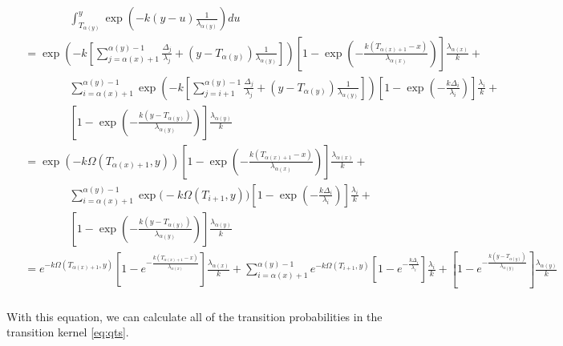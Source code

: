 \documentclass{article}
\begin{document}
\begin{align}
\begin{split}
    &\qquad \qquad \int_{T_{\alpha(y)}}^y \exp\left(-k(y-u)\frac{1}{\lambda_{\alpha(y)}}\right)du \\
    &= \exp\left(-k\left[\sum_{j=\alpha(x)+1}^{\alpha(y)-1}\frac{\Delta_j}{\lambda_j} +
        (y-T_{\alpha(y)})\frac{1}{\lambda_{\alpha(y)}}\right]\right) 
        \left[1-\exp\left(-\frac{k \left(T_{\alpha(x)+1}-x\right)}{\lambda_{\alpha(x)}}\right)\right]\frac{\lambda_{\alpha(x)}}{k}+\\
    &\qquad\qquad \sum_{i=\alpha(x)+1}^{\alpha(y)-1}
        \exp\left(-k\left[\sum_{j=i+1}^{\alpha(y)-1}\frac{\Delta_j}{\lambda_j} + (y-T_{\alpha(y)})\frac{1}{\lambda_{\alpha(y)}}
        \right]\right)
    \left[1-\exp\left(-\frac{k \Delta_i}{\lambda_i}\right)\right]\frac{\lambda_i}{k}+\\
    &\qquad \qquad 
    \left[1-\exp\left(-\frac{k \left(y-T_{\alpha(y)}\right)}{\lambda_{\alpha(y)}}\right)\right]\frac{\lambda_{\alpha(y)}}{k}\\
    &= \exp\left(-k\Omega(T_{\alpha(x)+1}, y)\right)\left[1-\exp\left(-\frac{k \left(T_{\alpha(x)+1}-x\right)}{\lambda_{\alpha(x)}}\right)\right]\frac{\lambda_{\alpha(x)}}{k}+\\
    &\qquad\qquad \sum_{i=\alpha(x)+1}^{\alpha(y)-1} \exp\big(-k\Omega(T_{i+1},y)\big)
    \left[1-\exp\left(-\frac{k \Delta_i}{\lambda_i}\right)\right]\frac{\lambda_i}{k}+\\
    &\qquad \qquad 
    \left[1-\exp\left(-\frac{k \left(y-T_{\alpha(y)}\right)}{\lambda_{\alpha(y)}}\right)\right]\frac{\lambda_{\alpha(y)}}{k}\\
    &= e^{-k\Omega(T_{\alpha(x)+1}, y)}\left[1-e^{-\frac{k \left(T_{\alpha(x)+1}-x\right)}{\lambda_{\alpha(x)}}}\right]\frac{\lambda_{\alpha(x)}}{k}+
    \sum_{i=\alpha(x)+1}^{\alpha(y)-1} e^{-k\Omega(T_{i+1},y)}
    \left[1-e^{-\frac{k \Delta_i}{\lambda_i}}\right]\frac{\lambda_i}{k}+
    \left[1-e^{-\frac{k \left(y-T_{\alpha(y)}\right)}{\lambda_{\alpha(y)}}}\right]\frac{\lambda_{\alpha(y)}}{k}\\
    \end{split}
    \label{eq:piecewisenocoalintegral}
\end{align}

With this equation, we can calculate all of the transition probabilities in the
transition kernel \eqref{eq:qts}.
\end{document}
